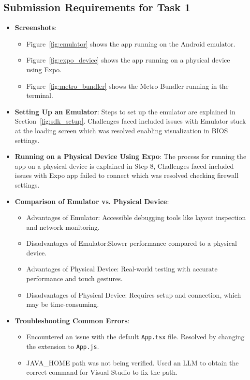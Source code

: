 \documentclass{article}
\begin{document}
\subsection{Submission Requirements for Task 1}
\begin{itemize}
    \item \textbf{Screenshots}: 
    \begin{itemize}
        \item Figure~\ref{fig:emulator} shows the app running on the Android emulator.
        \item Figure~\ref{fig:expo_device} shows the app running on a physical device using Expo.
        \item Figure~\ref{fig:metro_bundler} shows the Metro Bundler running in the terminal.
    \end{itemize}
    \item \textbf{Setting Up an Emulator}: Steps to set up the emulator are explained in Section~\ref{fig:sdk_setup}. Challenges faced included issues with Emulator stuck at the loading screen which was resolved enabling visualization in BIOS settings.
    \item \textbf{Running on a Physical Device Using Expo}: The process for running the app on a physical device is explained in Step 8, Challenges faced included issues with Expo app failed to connect which was resolved  checking firewall settings.
    \item \textbf{Comparison of Emulator vs. Physical Device}: 
    \begin{itemize}
        \item Advantages of Emulator: Accessible debugging tools like layout inspection and network monitoring.
        \item Disadvantages of Emulator:Slower performance compared to a physical device.
        \item Advantages of Physical Device: Real-world testing with accurate performance and touch gestures.
        \item Disadvantages of Physical Device: Requires setup and connection, which may be time-consuming.
    \end{itemize}
    \item \textbf{Troubleshooting Common Errors}: 
    \begin{itemize}
        \item Encountered an issue with the default \texttt{App.tsx} file. Resolved by changing the extension to \texttt{App.js}.
        \item JAVA\_HOME path was not being verified. Used an LLM to obtain the correct command for Visual Studio to fix the path.
    \end{itemize}
\end{itemize}
\end{document}
